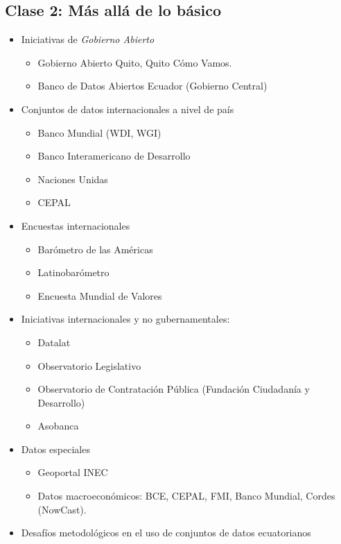 \documentclass[
  letterpaper,
  DIV=11,
  numbers=noendperiod]{scrartcl}
\providecommand{\tightlist}{%
  \setlength{\itemsep}{0pt}\setlength{\parskip}{0pt}}\usepackage{longtable,booktabs,array}
\begin{document}
\subsection{Clase 2: Más allá de lo
básico}\label{clase-2-muxe1s-alluxe1-de-lo-buxe1sico}

\begin{itemize}
\tightlist
\item
  Iniciativas de \emph{Gobierno Abierto}

  \begin{itemize}
  \tightlist
  \item
    Gobierno Abierto Quito, Quito Cómo Vamos.
  \item
    Banco de Datos Abiertos Ecuador (Gobierno Central)
  \end{itemize}
\item
  Conjuntos de datos internacionales a nivel de país

  \begin{itemize}
  \tightlist
  \item
    Banco Mundial (WDI, WGI)
  \item
    Banco Interamericano de Desarrollo
  \item
    Naciones Unidas
  \item
    CEPAL
  \end{itemize}
\item
  Encuestas internacionales

  \begin{itemize}
  \tightlist
  \item
    Barómetro de las Américas
  \item
    Latinobarómetro
  \item
    Encuesta Mundial de Valores
  \end{itemize}
\item
  Iniciativas internacionales y no gubernamentales:

  \begin{itemize}
  \tightlist
  \item
    Datalat
  \item
    Observatorio Legislativo
  \item
    Observatorio de Contratación Pública (Fundación Ciudadanía y
    Desarrollo)
  \item
    Asobanca
  \end{itemize}
\item
  Datos especiales

  \begin{itemize}
  \tightlist
  \item
    Geoportal INEC
  \item
    Datos macroeconómicos: BCE, CEPAL, FMI, Banco Mundial, Cordes
    (NowCast).
  \end{itemize}
\item
  Desafíos metodológicos en el uso de conjuntos de datos ecuatorianos


\end{itemize}
\end{document}
